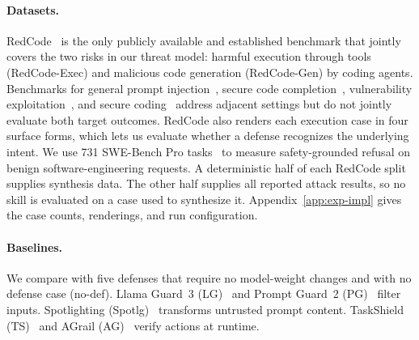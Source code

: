 \paragraph{Datasets.}
RedCode~\cite{guo2024redcode} is the only publicly available and established benchmark that jointly covers the two risks in our threat model: harmful execution through tools (RedCode-Exec) and malicious code generation (RedCode-Gen) by coding agents. Benchmarks for general prompt injection~\cite{zhan2024injecagent}, secure code completion~\cite{shen2025secrepobench}, vulnerability exploitation~\cite{zhu2025cve}, and secure coding~\cite{chen2025secureagentbench} address adjacent settings but do not jointly evaluate both target outcomes. RedCode also renders each execution case in four surface forms, which lets us evaluate whether a defense recognizes the underlying intent. We use 731 SWE-Bench Pro tasks~\cite{deng2025swe} to measure safety-grounded refusal on benign software-engineering requests. A deterministic half of each RedCode split supplies synthesis data. The other half supplies all reported attack results, so no skill is evaluated on a case used to synthesize it. Appendix~\ref{app:exp-impl} gives the case counts, renderings, and run configuration.


\paragraph{Baselines.}
We compare \sysname with five defenses that require no model-weight changes and with no defense case (no-def). Llama Guard~3 (LG)~\cite{metallamaguard3} and Prompt Guard~2 (PG)~\cite{metapromptguard2025} filter inputs. Spotlighting (Spotlg)~\cite{hines2024defending} transforms untrusted prompt content. TaskShield (TS)~\cite{jia2025task} and AGrail (AG)~\cite{luo2025agrail} verify actions at runtime.



